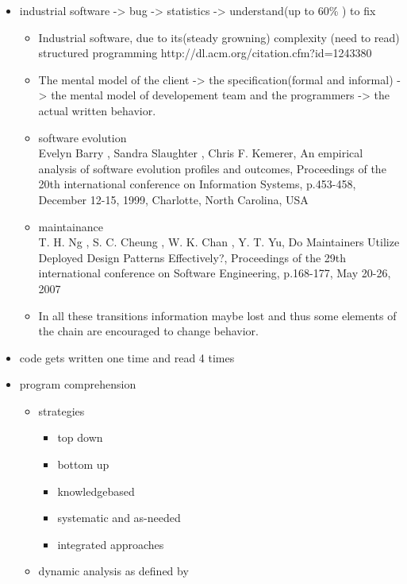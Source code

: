 \begin{itemize}
\item industrial software -> bug -> statistics -> understand(up to 60\% \cite{Pigoski:1996:PSM:524398}) to fix
	\begin{itemize}
	\item Industrial software, due to its(steady growning) complexity \cite{Lehman:1985:PEP:7261}(need to read) \\ structured programming http://dl.acm.org/citation.cfm?id=1243380
	\item The mental model of the client -> the specification(formal and informal) -> the mental model of developement team and the programmers -> the actual written behavior.
	\item software evolution \\
		Evelyn Barry , Sandra Slaughter , Chris F. Kemerer, An empirical analysis of software evolution profiles and outcomes, Proceedings of the 20th international conference on Information Systems, p.453-458, December 12-15, 1999, Charlotte, North Carolina, USA
	\item maintainance \cite{Lientz:1980:SMM:601062} \cite{ISOSWMaintainance} \\
		T. H. Ng , S. C. Cheung , W. K. Chan , Y. T. Yu, Do Maintainers Utilize Deployed Design Patterns Effectively?, Proceedings of the 29th international conference on Software Engineering, p.168-177, May 20-26, 2007
	\item In all these transitions information maybe lost and thus some elements of the chain are encouraged to change behavior.
	\end{itemize}
\item code gets written one time and read 4 times
\item program comprehension
	\begin{itemize}
	\item strategies \cite{Storey:1999:CDE:308936.308940}
		\begin{itemize}
		\item top down
		\item bottom up
		\item knowledgebased
		\item systematic and as-needed
		\item integrated approaches
		\end{itemize}
	\item dynamic analysis as defined by \cite{Ball:1999:CDA:318774.318944} \cite{Cornelissen:2009:SSP:1638616.1639301}
		\begin{itemize}

\end{itemize}
\end{itemize}
\end{itemize}
